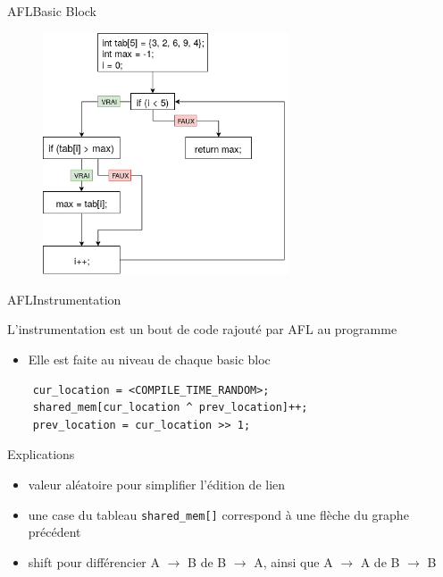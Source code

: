 \begin{frame}{AFL}{Basic Block}
  \begin{figure}
    \includegraphics[width=0.65\textwidth]{../medias/BB.png}
  \end{figure}
\end{frame}

\begin{frame}[fragile]{AFL}{Instrumentation}
  {\Large \centerline{L'instrumentation est un bout de code rajouté par AFL au programme}}
  \begin{itemize}
    \item{Elle est faite au niveau de chaque basic bloc} \pause
  \end{itemize}

  \hspace{0.5cm}

  \begin{lstlisting}
    cur_location = <COMPILE_TIME_RANDOM>;
    shared_mem[cur_location ^ prev_location]++;
    prev_location = cur_location >> 1;
  \end{lstlisting}

  \pause
  \hspace{3.5cm}

  \begin{exampleblock}{Explications}
    \begin{itemize}
      \item{valeur aléatoire pour simplifier l'édition de lien} \pause
      \item{une case du tableau \lstinline{shared_mem[]} correspond à une flèche du graphe précédent} \pause
      \item{shift pour différencier A $\rightarrow$ B de B $\rightarrow$ A, ainsi que A $\rightarrow$ A de B $\rightarrow$ B}
    \end{itemize}
  \end{exampleblock}
\end{frame}

